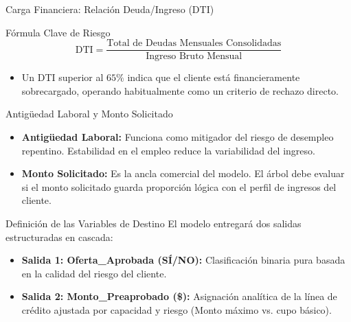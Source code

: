 \documentclass[10pt, aspectratio=169]{beamer}
\begin{document}
	\begin{frame}{Carga Financiera: Relación Deuda/Ingreso (DTI)}
		\begin{block}{Fórmula Clave de Riesgo}
			\begin{equation*}
				\text{DTI} = \frac{\text{Total de Deudas Mensuales Consolidadas}}{\text{Ingreso Bruto Mensual}}
			\end{equation*}
		\end{block}
		\begin{itemize}
			\item Un DTI superior al $65\%$ indica que el cliente está financieramente sobrecargado, operando habitualmente como un criterio de rechazo directo.
		\end{itemize}
	\end{frame}
	
	\begin{frame}{Antigüedad Laboral y Monto Solicitado}
		\begin{itemize}
			\item \textbf{Antigüedad Laboral:} Funciona como mitigador del riesgo de desempleo repentino. Estabilidad en el empleo reduce la variabilidad del ingreso.
			\item \textbf{Monto Solicitado:} Es la ancla comercial del modelo. El árbol debe evaluar si el monto solicitado guarda proporción lógica con el perfil de ingresos del cliente.
		\end{itemize}
	\end{frame}
	
	\begin{frame}{Definición de las Variables de Destino}
		El modelo entregará dos salidas estructuradas en cascada:
		\vspace{0.3cm}
		\begin{itemize}
			\item \textbf{Salida 1: Oferta\_Aprobada (SÍ/NO):} Clasificación binaria pura basada en la calidad del riesgo del cliente.
			\item \textbf{Salida 2: Monto\_Preaprobado (\$):} Asignación analítica de la línea de crédito ajustada por capacidad y riesgo (Monto máximo vs. cupo básico).
		\end{itemize}
	\end{frame}
	
\end{document}
